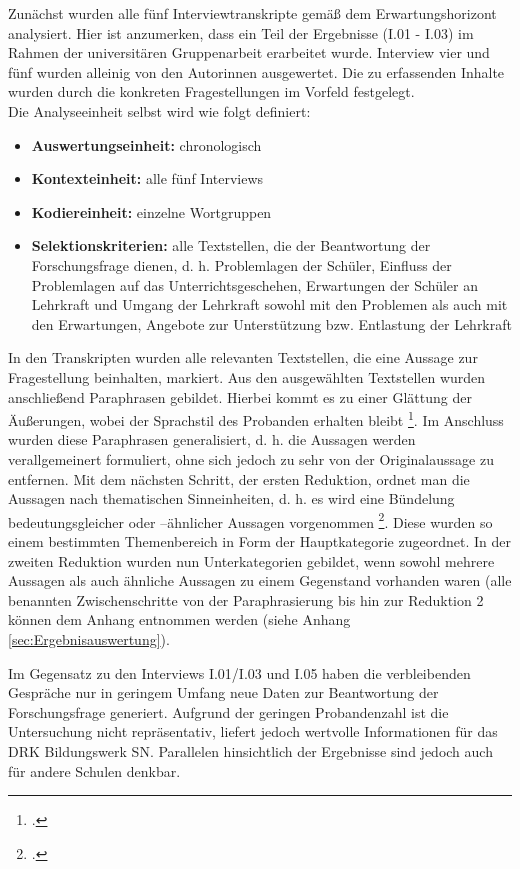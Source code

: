 Zunächst wurden alle fünf Interviewtranskripte gemäß dem Erwartungshorizont analysiert. Hier ist anzumerken, dass ein Teil der Ergebnisse (I.01 - I.03) im Rahmen der universitären Gruppenarbeit erarbeitet wurde. Interview vier und fünf wurden alleinig von den Autorinnen ausgewertet. Die zu erfassenden Inhalte wurden durch die konkreten Fragestellungen im Vorfeld festgelegt.\\

\noindent
Die Analyseeinheit selbst wird wie folgt definiert:

\begin{itemize}
	\item \textbf{Auswertungseinheit:} chronologisch
	\item \textbf{Kontexteinheit:} alle fünf Interviews
	\item \textbf{Kodiereinheit:} einzelne Wortgruppen
	\item \textbf{Selektionskriterien:} alle Textstellen, die der Beantwortung der Forschungsfrage dienen, d. h. Problemlagen der Schüler, Einfluss der Problemlagen auf das Unterrichtsgeschehen, Erwartungen der Schüler an Lehrkraft und Umgang der Lehrkraft sowohl mit den Problemen als auch mit den Erwartungen, Angebote zur Unterstützung bzw. Entlastung der Lehrkraft
\end{itemize}

\noindent
In den Transkripten wurden alle relevanten Textstellen, die eine Aussage zur Fragestellung beinhalten, markiert. Aus den ausgewählten Textstellen wurden anschließend Paraphrasen gebildet. Hierbei kommt es zu einer Glättung der Äußerungen, wobei der Sprachstil des Probanden erhalten bleibt \footcite[vgl.][138]{Krueger2014}. Im Anschluss wurden diese Paraphrasen generalisiert, d. h. die Aussagen werden verallgemeinert formuliert, ohne sich jedoch zu sehr von der Originalaussage zu entfernen. Mit dem nächsten Schritt, der ersten Reduktion, ordnet man die Aussagen nach thematischen Sinneinheiten, d. h. es wird eine Bündelung bedeutungsgleicher oder --ähnlicher Aussagen vorgenommen \footcite[vgl.][139]{Krueger2014}. Diese wurden so einem bestimmten Themenbereich in Form der Hauptkategorie zugeordnet. In der zweiten Reduktion wurden nun Unterkategorien gebildet, wenn sowohl mehrere Aussagen als auch ähnliche Aussagen zu einem Gegenstand vorhanden waren (alle benannten Zwischenschritte von der Paraphrasierung bis hin zur Reduktion 2 können dem Anhang entnommen werden (siehe Anhang \ref{sec:Ergebnisauswertung}).

Im Gegensatz zu den Interviews I.01/I.03 und I.05 haben die verbleibenden Gespräche nur in geringem Umfang neue Daten zur Beantwortung der Forschungsfrage generiert. Aufgrund der geringen Probandenzahl ist die Untersuchung nicht repräsentativ, liefert jedoch wertvolle Informationen für das DRK Bildungswerk SN. Parallelen hinsichtlich der Ergebnisse sind jedoch auch für andere Schulen denkbar.
